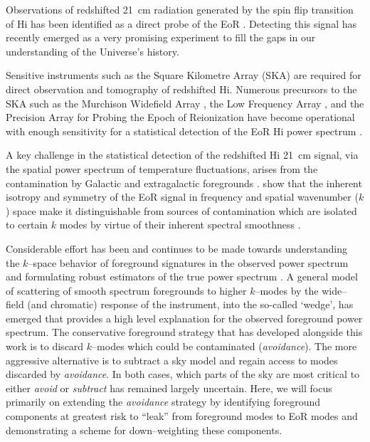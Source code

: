 \documentclass[preprint2,iop,numberedappendix]{emulateapj}
\begin{document}
Observations of redshifted 21~cm radiation generated by the spin flip transition of H{\sc i} has been identified as a direct probe of the EoR \citep{sun72,sco90,mad97,toz00,ili02}. Detecting this signal has recently emerged as a very promising experiment to fill the gaps in our understanding of the Universe's history.  

Sensitive instruments such as the Square Kilometre Array (SKA) are required for direct observation and tomography of redshifted H{\sc i}. Numerous precursors to the SKA such as the Murchison Widefield Array \citep[MWA;][]{tin13,bow13,lon09}, the Low Frequency Array \citep[LOFAR;][]{van13}, and the Precision Array for Probing the Epoch of Reionization \citep[PAPER;][]{par10} have become operational with enough sensitivity for a statistical detection of the EoR H{\sc i} power spectrum \citep{bow06,bea13,dil13,thy13,pob14}. 

A key challenge in the statistical detection of the redshifted H{\sc i} 21~cm signal, via the spatial power spectrum of temperature fluctuations, arises from the contamination by Galactic and extragalactic foregrounds \citep[see, e.g.,][]{dim02,zal04,fur06,ali08,ber09,ber10,gho12}. \citet{mor04} show that the inherent isotropy and symmetry of the EoR signal in frequency and spatial wavenumber ($k$) space make it distinguishable from sources of contamination which are isolated to certain $k$ modes by virtue of their inherent spectral smoothness \citep{mor06,bow09,liu11,par12,dil13}.

Considerable effort has been and continues to be made towards understanding the $k$--space behavior of foreground signatures in the observed power spectrum and formulating robust estimators of the true power spectrum \citep{bow09,liu09,dat10,liu11,mor12,tro12,pob13,thy13,dil14,liu14a,liu14b}. A general model of scattering of smooth spectrum foregrounds to higher $k$--modes by the wide--field (and chromatic) response of the instrument, into the so-called `wedge', has emerged that provides a high level explanation for the observed foreground power spectrum. The conservative foreground strategy that has developed alongside this work is to discard $k$--modes which could be contaminated ({\it avoidance}). The more aggressive alternative is to subtract a sky model and regain access to modes discarded by {\it avoidance}. In both cases, which parts of the sky are most critical to either {\it avoid} or {\it subtract} has remained largely uncertain. Here, we will focus primarily on extending the {\it avoidance} strategy by identifying foreground components at greatest risk to ``leak'' from foreground modes to EoR modes and demonstrating a scheme for down--weighting these components.
\end{document}
